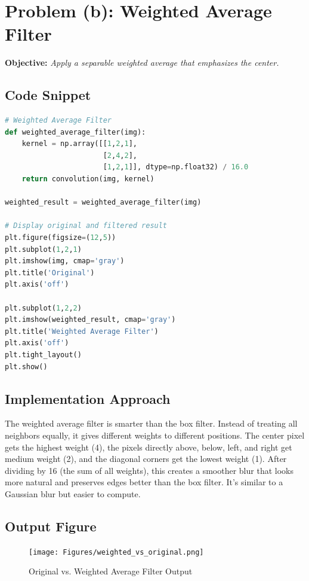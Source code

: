 \documentclass[12pt,a4paper]{report}
\begin{document}
\section{Problem (b): Weighted Average Filter}
\textbf{Objective:} \textit{Apply a separable weighted average that emphasizes the center.}

\subsection{Code Snippet}
\begin{lstlisting}[language=Python, caption={Weighted Average Filter (1-2-1 Kernel)}]
# Weighted Average Filter
def weighted_average_filter(img):
    kernel = np.array([[1,2,1],
                       [2,4,2],
                       [1,2,1]], dtype=np.float32) / 16.0
    return convolution(img, kernel)

weighted_result = weighted_average_filter(img)

# Display original and filtered result
plt.figure(figsize=(12,5))
plt.subplot(1,2,1)
plt.imshow(img, cmap='gray')
plt.title('Original')
plt.axis('off')

plt.subplot(1,2,2)
plt.imshow(weighted_result, cmap='gray')
plt.title('Weighted Average Filter')
plt.axis('off')
plt.tight_layout()
plt.show()
\end{lstlisting}

\subsection{Implementation Approach}
The weighted average filter is smarter than the box filter. Instead of treating all neighbors equally, it gives different weights to different positions. The center pixel gets the highest weight (4), the pixels directly above, below, left, and right get medium weight (2), and the diagonal corners get the lowest weight (1). After dividing by 16 (the sum of all weights), this creates a smoother blur that looks more natural and preserves edges better than the box filter. It's similar to a Gaussian blur but easier to compute.

\subsection{Output Figure}
\begin{figure}[H]
\centering
\texttt{[image: Figures/weighted\_vs\_original.png]}
\caption{Original vs. Weighted Average Filter Output}
\end{figure}
\end{document}
